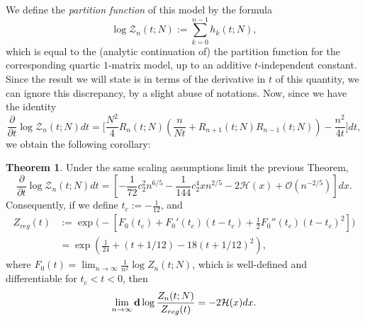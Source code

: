\documentclass[usenames,dvipsnames]{article}
\theoremstyle{definition}
\newtheorem{theorem}{Theorem}[section]
\numberwithin{equation}{section}
\numberwithin{figure}{section}
\begin{document}
    We define the \textit{partition function} of this model by the formula
        \begin{equation}
            \log \mathcal{Z}_{n}(t;N) := \sum_{k=0}^{n-1} h_{k}(t;N),
        \end{equation}
    which is equal to the (analytic continuation of) the partition function for the corresponding quartic $1$-matrix model, up to an additive $t$-independent constant. Since the result we will state is in terms of the derivative in $t$ of this quantity, we can ignore this discrepancy, by a slight abuse of notations.
    Now, since we have the identity
        \begin{equation}
            \frac{\partial}{\partial t} \log \mathcal{Z}_{n}(t;N) dt = \bigg[\frac{N^2}{4}R_{n}(t;N)\left(\frac{n}{Nt} + R_{n+1}(t;N)R_{n-1}(t;N)\right)-\frac{n^2}{4t}\bigg]dt,
        \end{equation}
    we obtain the following corollary:
        \begin{theorem}
            Under the same scaling assumptions limit the previous Theorem,
                \begin{equation}
                    \frac{\partial}{\partial t} \log \mathcal{Z}_{n}(t;N) dt = \left[-\frac{1}{72}c_2^2n^{6/5}-\frac{1}{144}c_2^4xn^{2/5} -2\mathcal{H}(x) + \mathcal{O}(n^{-2/5})\right]dx.
                \end{equation}
            Consequently, if we define $t_c:=-\frac{1}{12}$, and
                \begin{align}
                    Z_{reg}(t) &:=\exp\bigg(-\left[F_0(t_c) + F_0'(t_c)(t-t_c) + \frac{1}{2}F_0''(t_c)(t-t_c)^2\right]\bigg)\nonumber\\
                    &= \exp\left(\frac{1}{24} + (t+1/12) - 18(t+1/12)^2\right),
                \end{align}
            where $F_0(t) = \lim_{n\to \infty} \frac{1}{n^2}\log Z_n(t;N)$, which is well-defined and differentiable for $t_c<t<0$, then
                \begin{equation}
                    \lim_{n\to \infty}{\bf d} \log \frac{Z_n(t;N)}{Z_{reg}(t)} = -2\mathcal{H}(x)dx.
                \end{equation} 
        \end{theorem}




\printbibliography
\end{document}
